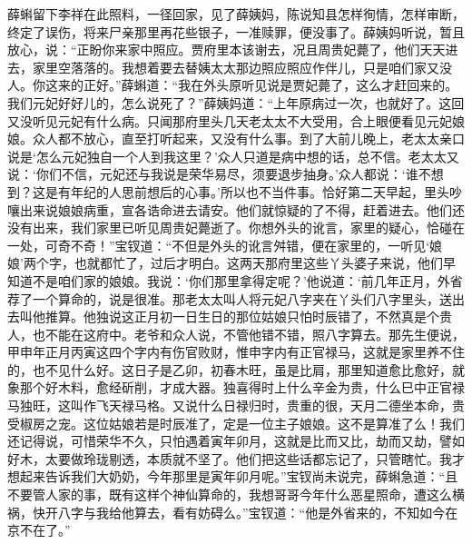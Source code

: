 \begin{parag}
    薛蝌留下李祥在此照料，一径回家，见了薛姨妈，陈说知县怎样徇情，怎样审断，终定了误伤，将来尸亲那里再花些银子，一准赎罪，便没事了。薛姨妈听说，暂且放心，说：“正盼你来家中照应。贾府里本该谢去，况且周贵妃薨了，他们天天进去，家里空落落的。我想着要去替姨太太那边照应照应作伴儿，只是咱们家又没人。你这来的正好。”薛蝌道：“我在外头原听见说是贾妃薨了，这么才赶回来的。我们元妃好好儿的，怎么说死了？”薛姨妈道：“上年原病过一次，也就好了。这回又没听见元妃有什么病。只闻那府里头几天老太太不大受用，合上眼便看见元妃娘娘。众人都不放心，直至打听起来，又没有什么事。到了大前儿晚上，老太太亲口说是‘怎么元妃独自一个人到我这里？’众人只道是病中想的话，总不信。老太太又说：‘你们不信，元妃还与我说是荣华易尽，须要退步抽身。’众人都说：‘谁不想到？这是有年纪的人思前想后的心事。’所以也不当件事。恰好第二天早起，里头吵嚷出来说娘娘病重，宣各诰命进去请安。他们就惊疑的了不得，赶着进去。他们还没有出来，我们家里已听见周贵妃薨逝了。你想外头的讹言，家里的疑心，恰碰在一处，可奇不奇！”宝钗道：“不但是外头的讹言舛错，便在家里的，一听见‘娘娘’两个字，也就都忙了，过后才明白。这两天那府里这些丫头婆子来说，他们早知道不是咱们家的娘娘。我说：‘你们那里拿得定呢？’他说道：‘前几年正月，外省荐了一个算命的，说是很准。那老太太叫人将元妃八字夹在丫头们八字里头，送出去叫他推算。他独说这正月初一日生日的那位姑娘只怕时辰错了，不然真是个贵人，也不能在这府中。老爷和众人说，不管他错不错，照八字算去。那先生便说，甲申年正月丙寅这四个字内有伤官败财，惟申字内有正官禄马，这就是家里养不住的，也不见什么好。这日子是乙卯，初春木旺，虽是比肩，那里知道愈比愈好，就象那个好木料，愈经斫削，才成大器。独喜得时上什么辛金为贵，什么巳中正官禄马独旺，这叫作飞天禄马格。又说什么日禄归时，贵重的很，天月二德坐本命，贵受椒房之宠。这位姑娘若是时辰准了，定是一位主子娘娘。这不是算准了么！我们还记得说，可惜荣华不久，只怕遇着寅年卯月，这就是比而又比，劫而又劫，譬如好木，太要做玲珑剔透，本质就不坚了。他们把这些话都忘记了，只管瞎忙。我才想起来告诉我们大奶奶，今年那里是寅年卯月呢。”宝钗尚未说完，薛蝌急道：“且不要管人家的事，既有这样个神仙算命的，我想哥哥今年什么恶星照命，遭这么横祸，快开八字与我给他算去，看有妨碍么。”宝钗道：“他是外省来的，不知如今在京不在了。”
\end{parag}


